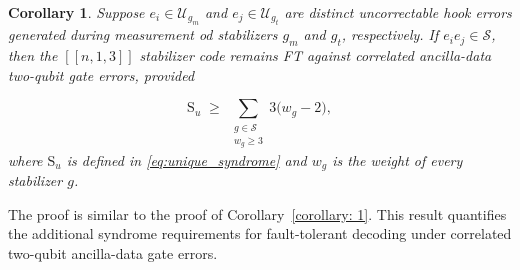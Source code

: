 \documentclass[reprint, amsmath,amssymb, aps,pra,
 floatfix,
]{revtex4-2}
\newtheorem{corollary}[theorem]{Corollary}
\begin{document}
\begin{corollary}
\label{corollary: 2}
Suppose $e_i \in \mathcal{U}_{g_m}$ and $e_j  \in \mathcal{U}_{g_t}$ are distinct uncorrectable hook errors generated during measurement od stabilizers $g_m$ and $g_t$, respectively. If  $e_i e_j \in \mathcal{S}$, then the $[[n,1,3]]$ stabilizer code remains FT against correlated ancilla-data two-qubit gate errors, provided  





\begin{equation}\label{eq:two_qubit_count}
\mathrm{S}_u\;\ge\; \sum_{\substack{g\in\mathcal S\\ w_g\ge 3}} 3\big(w_g-2\big),
\end{equation}
where $\mathrm{S}_{u}$ is defined in \eqref{eq:unique_syndrome} and $w_g$ is the weight of every stabilizer $g$.
\end{corollary}
\noindent The proof is similar to the proof of Corollary~\ref{corollary: 1}. 
This result quantifies the additional syndrome requirements for fault-tolerant decoding under correlated two-qubit ancilla-data gate errors.
\end{document}
